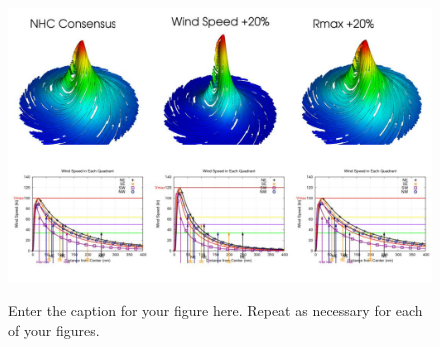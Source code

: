 \documentclass[12pt]{article}
\begin{document}
\begin{figure}[t]
  \noindent\includegraphics[width=40pc,angle=0]{variations.pdf}\\
  \caption{Enter the caption for your figure here.  Repeat as
  necessary for each of your figures.}\label{f6}
\end{figure}




%
\end{document}
